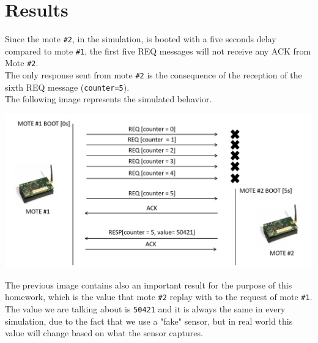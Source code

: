\documentclass{article}
\begin{document}
        \section{Results} %
        Since the mote \texttt{\#2}, in the simulation, is booted with a five seconds delay compared to mote \texttt{\#1}, the first five REQ messages will not receive any ACK from Mote \texttt{\#2}.\\
        The only response sent from mote \texttt{\#2} is the consequence of the reception of the sixth REQ message (\texttt{counter=5}).\\ 
        The following image represents the simulated behavior.

        \begin{center}
        \includegraphics[width=1\textwidth]{./simulation.png}            
        \end{center}
        
        The previous image contains also an important result for the purpose of this homework, which is the value that mote \texttt{\#2} replay with to the request of mote \texttt{\#1}. The value we are talking about is \texttt{50421} and it is always the same in every simulation, due to the fact that we use a "fake" sensor, but in real world this value will change based on what the sensor captures.
        \\
        
        \pagebreak
		\pagebreak
		\clearpage
\end{document}
